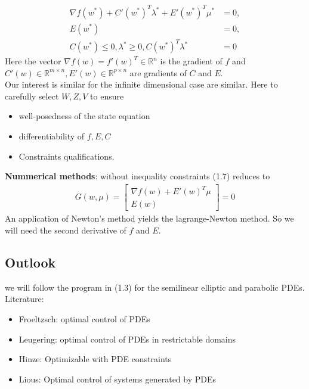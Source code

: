 \begin{equation}
\begin{aligned}
	\nabla f(w^*) + C'(w^*)^T \lambda^* + E'(w^*)^T \mu^* &= 0, \\
	E(w^*) &= 0, \\
	C(w^*) \le 0, \lambda^* \geq 0, C(w^*)^T \lambda ^* &= 0
\end{aligned}
\end{equation}
Here the vector $\nabla f(w) = f'(w)^T \in \mathbb{R}^n$ is the gradient of $f$ and $C'(w) \in \mathbb{R}^{m \times n}, E'(w) \in \mathbb{R}^{p \times n}$ are gradients of $C$ and $E$. \\
Our interest is similar for the infinite dimensional case are similar. Here to carefully select $W, Z, V$ to ensure 
\begin{itemize}
	\item well-posedness of the state equation
	\item differentiability of $f, E, C$ 
	\item Constraints qualifications. 
\end{itemize}
\textbf{Nummerical methods}: without inequality constraints (1.7) reduces to 
\begin{align}
	G(w, \mu) = 
	\begin{bmatrix}
		\nabla f(w) + E'(w)^T\mu\\
		E(w)
	\end{bmatrix}
	= 0
\end{align}
An application of Newton's method yields the lagrange-Newton method. So we will need the second derivative of $f$ and $E$. 


\subsection{Outlook}
we will follow the program in (1.3) for the semilinear elliptic and parabolic PDEs. \\
Literature:
\begin{itemize}
  \item Froeltzsch: optimal control of PDEs
  \item Leugering: optimal control of PDEs in restrictable domains
  \item Hinze: Optimizable with PDE constraints
  \item Lious: Optimal control of systems generated by PDEs
\end{itemize}





